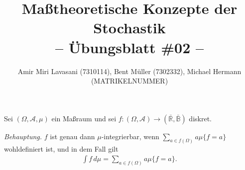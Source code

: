 \documentclass[10pt]{article}
\newcommand{\R}{\mathbb{R}}
\newcommand{\beh}{\textit{Behauptung. }}
\newenvironment{Aufgabe}[2][Aufgabe]{\begin{trivlist}
\item[\hskip \labelsep {\bfseries #1}\hskip \labelsep {\bfseries #2.}]}{\end{trivlist}}
\begin{document}
 
\title{ \textbf{Maßtheoretische Konzepte der Stochastik \\ -- Übungsblatt \#02 --} }

\author{Amir Miri Lavasani (7310114), Bent Müller (7302332),
        Michael Hermann (MATRIKELNUMMER)} \maketitle

 
\begin{Aufgabe}{2}
    Sei $(\Omega,\mathcal{A},\mu)$ ein Maßraum und sei $f: (\Omega,\mathcal{A})\to (\bar{\R} , \bar{\mathbb{B}})$
    diskret. 
\end{Aufgabe}

\beh $f$ ist genau dann $\mu$-integrierbar, wenn $\sum_{a\in f(\Omega)} a\mu\{f=a\}$ 
wohldefiniert ist, und in dem Fall gilt 
  \begin{align*}
    \int f \,d\mu = \sum_{a\in f(\Omega)} a\mu\{f=a\}.
  \end{align*}
\end{document}
